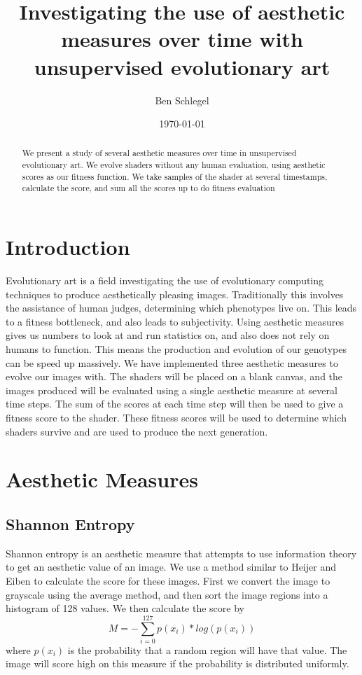 \documentclass{article}
\title{Investigating the use of aesthetic measures over time with unsupervised evolutionary art}
\author{Ben Schlegel}
\date{\today}
\begin{document}
\begin{titlepage}
    \maketitle
\end{titlepage}
\begin{abstract}
    We present a study of several aesthetic measures over time in unsupervised evolutionary art. We evolve shaders without any human evaluation, using aesthetic scores as our fitness function. We take samples of the shader at several timestamps, calculate the score, and sum all the scores up to do fitness evaluation
\end{abstract}

\section*{Introduction}
Evolutionary art is a field investigating the use of evolutionary computing techniques to produce aesthetically pleasing images. Traditionally this involves the assistance of human judges, determining which phenotypes live on. This leads to a fitness bottleneck,
and also leads to subjectivity. Using aesthetic measures gives us numbers to look at and run statistics on, and also does not rely on humans to function. This means the production and evolution of our genotypes can be speed up massively. We have implemented three aesthetic measures to evolve our images with. The shaders will be placed on a blank canvas, and the images produced will be evaluated using a single aesthetic measure at several time steps. The sum of the scores at each time step will then be used to give a fitness score to the shader. These fitness scores will be used to determine which shaders 
survive and are used to produce the next generation.


\section*{Aesthetic Measures}

\subsection*{Shannon Entropy}
Shannon entropy is an aesthetic measure that attempts to use information theory to get an aesthetic value of an image. We use a method similar to Heijer and Eiben to calculate the score for these images. 
First we convert the image to grayscale using the average method, and then sort the image regions into a histogram of 128 values. We then calculate the score by
\begin{equation*}
    M = - \sum_{i=0}^{127} p(x_i) * log(p(x_i))
\end{equation*}
where $p(x_i)$ is the probability that a random region will have that value. The image will score high on this measure if the probability is distributed uniformly.
\end{document}
